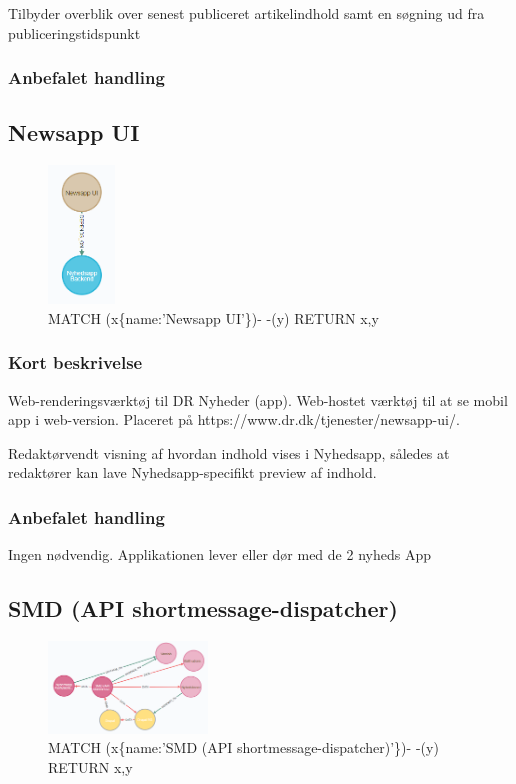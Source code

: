\documentclass{article}
\begin{document}
Tilbyder overblik over senest publiceret artikelindhold samt en søgning ud fra publiceringstidspunkt
\subsubsection*{Anbefalet handling}



\subsection{Newsapp UI}
\begin{figure}[h]
\includegraphics[width=50pt]{NyhedsAppUi.PNG}
\caption{MATCH (x\{name:'Newsapp UI'\})- -(y) RETURN x,y}
\end{figure}
\subsubsection*{Kort beskrivelse}
Web-renderingsværktøj til DR Nyheder (app). Web-hostet værktøj til at se mobil app i web-version. Placeret på https://www.dr.dk/tjenester/newsapp-ui/.	

Redaktørvendt visning af hvordan indhold vises i Nyhedsapp, således at redaktører kan lave Nyhedsapp-specifikt preview af indhold.
\subsubsection*{Anbefalet handling}
Ingen nødvendig. Applikationen lever eller dør med de 2 nyheds App


\subsection{SMD (API shortmessage-dispatcher)}
\begin{figure}[h]
\includegraphics[width=120pt]{SMD.PNG}
\caption{MATCH (x\{name:'SMD (API shortmessage-dispatcher)'\})- -(y) RETURN x,y}
\end{figure}
\end{document}
